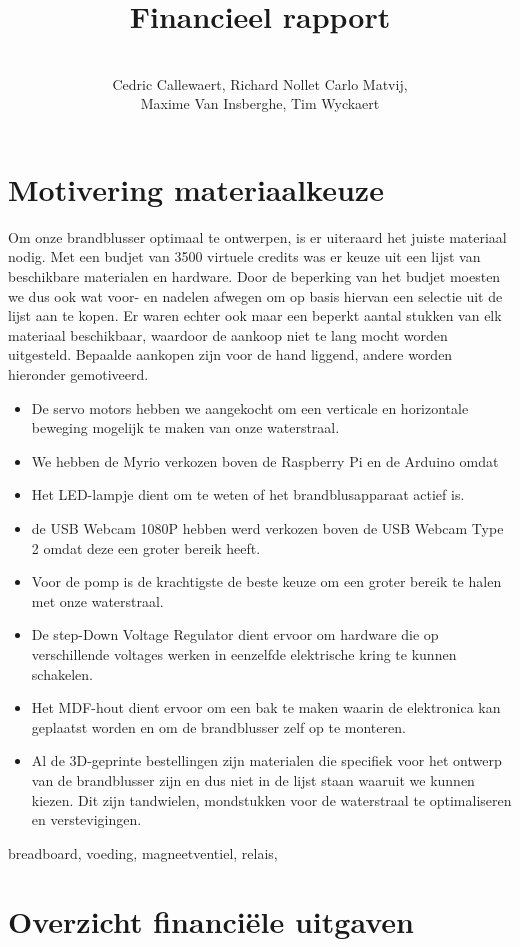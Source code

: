 \documentclass[kulak]{kulakarticle} %
\title{Financieel rapport}
\author{ \\Cedric Callewaert, Richard Nollet 
	Carlo Matvij,\\ Maxime Van Insberghe, Tim Wyckaert}
\begin{document}
\maketitle
	
	\section{Motivering materiaalkeuze}
	Om onze brandblusser optimaal te ontwerpen, is er uiteraard het juiste materiaal nodig. Met een budjet van 3500 virtuele credits was er keuze uit een lijst van beschikbare materialen en hardware. Door de beperking van het budjet moesten we dus ook wat voor- en nadelen afwegen om op basis hiervan een selectie uit de lijst aan te kopen.	Er waren echter ook maar een beperkt aantal stukken van elk materiaal beschikbaar, waardoor de aankoop niet te lang mocht worden uitgesteld.
	Bepaalde aankopen zijn voor de hand liggend, andere worden hieronder gemotiveerd.
	
	\begin{itemize}
	\item De servo motors hebben we aangekocht om een verticale en horizontale beweging mogelijk te maken van onze waterstraal.
	
	\item We hebben de Myrio verkozen boven de Raspberry Pi en de Arduino omdat 
	
	\item Het LED-lampje dient om te weten of het brandblusapparaat actief is.
	
	\item de USB Webcam 1080P hebben werd verkozen boven de USB Webcam Type 2 omdat deze een groter bereik heeft. 
	
	\item Voor de pomp is de krachtigste de beste keuze om een groter bereik te halen met onze waterstraal. 
	
	\item De step-Down Voltage Regulator dient ervoor om hardware die op verschillende voltages werken in eenzelfde elektrische kring te kunnen schakelen.
	
	\item Het MDF-hout dient ervoor om een bak te maken waarin de elektronica kan geplaatst worden en om de brandblusser zelf op te monteren.
	
	\item Al de 3D-geprinte bestellingen zijn materialen die specifiek voor het ontwerp van de brandblusser zijn en dus niet in de lijst staan waaruit we kunnen kiezen. Dit zijn tandwielen, mondstukken voor de waterstraal te optimaliseren en verstevigingen. 
	\end{itemize}
	breadboard, voeding, magneetventiel, relais, 
%	
	\section{Overzicht financiële uitgaven}
	

	
	
	
	
\end{document}
